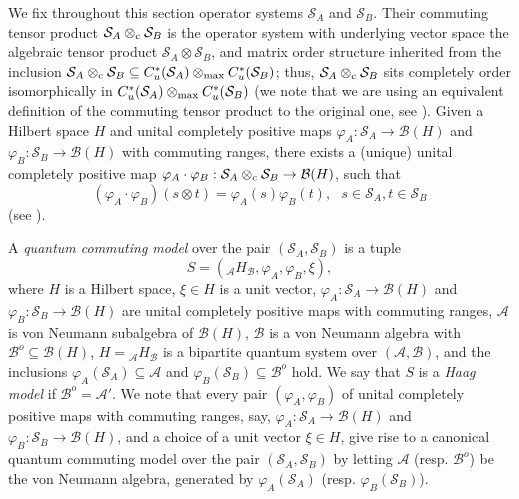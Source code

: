 \documentclass[11pt]{amsart}
\theoremstyle{definition}
\newcommand{\cl}[1]{\mathcal{#1}}
\begin{document}
We fix throughout this section operator systems $\cl S_A$ and $\cl S_B$.
Their commuting tensor product $\cl S_A\otimes_{\rm c} \cl S_B$ 
is the operator system with underlying vector space the algebraic tensor product
$\cl S_A\otimes \cl S_B$, and matrix order structure inherited from the 
inclusion $\cl S_A\otimes_{\rm c} \cl S_B\subseteq C_u^*(\cl S_A)\otimes_{\rm max} C_u^*(\cl S_B)$; thus, $\cl S_A\otimes_{\rm c} \cl S_B$ 
sits completely order isomorphically in
$C_u^*(\cl S_A)\otimes_{\rm max} C_u^*(\cl S_B)$
(we note that we are using an equivalent definition of the 
commuting tensor product to the original one, 
see \cite[Theorem 6.4]{KPTT11}). 
Given a Hilbert space $H$ and 
unital completely positive maps
$\varphi_A : \cl S_A\to \cl B(H)$ and $\varphi_B : \cl S_B\to \cl B(H)$
with commuting ranges, 
there exists a (unique) unital completely positive map 
$\varphi_A\cdot \varphi_B : \cl S_A\otimes_{\rm c} \cl S_B \to \cl B(H)$, 
such that 
$$(\varphi_A\cdot \varphi_B)(s\otimes t) = 
\varphi_A(s) \varphi_B(t), \ \ \ s\in \cl S_A, t\in \cl S_B$$
(see \cite[Corollary 6.5]{KPTT11}). 


A \emph{quantum commuting model} over the pair $(\cl S_A,\cl S_B)$
is a tuple
$$S=(_{\cl A}H_{\cl B},\varphi_A, \varphi_B, \xi),$$
where $H$ is a Hilbert space, $\xi\in H$ is a unit vector, 
$\varphi_A : \cl S_A\to \cl B(H)$ and $\varphi_B : \cl S_B\to \cl B(H)$
are unital completely positive maps with commuting ranges, 
$\cl A$ is von Neumann subalgebra of $\cl B(H)$, 
$\cl B$ is a von Neumann algebra with $\cl B^o\subseteq\cl B(H)$, 
$H = \mbox{}_{\cl A}H_{{\cl B}}$ is a bipartite quantum system over 
$(\cl A, \cl B)$, and the inclusions
$\varphi_{A}(\cl S_A)\subseteq \cl A$ and 
$\varphi_B(\cl S_B)\subseteq \cl B^o$ hold.
We say that $S$ is a \emph{Haag model} if $\cl B^o = \cl A'$.
We note that every pair $(\varphi_A,\varphi_B)$ of 
unital completely positive maps with commuting ranges, say, 
$\varphi_A : \cl S_A\to \cl B(H)$ and $\varphi_B : \cl S_B\to \cl B(H)$, 
and a choice of a unit vector
$\xi\in H$, give rise to a canonical quantum commuting model 
over the pair $(\cl S_A,\cl S_B)$ by letting $\cl A$ (resp. $\cl B^o$) 
be the von Neumann algebra, generated by $\varphi_A(\cl S_A)$
(resp. $\varphi_B(\cl S_B)$). 
\end{document}
